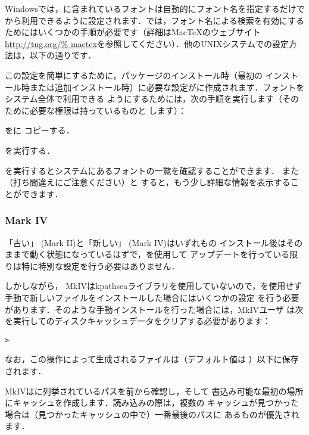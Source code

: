 \documentclass[uplatex,dvipdfmx]{jsarticle}
\begin{document}
Windowsでは，\TL に含まれているフォントは自動的にフォント名を指定するだけで\XeTeX
から利用できるように設定されます．\macOS では，フォント名による検索を有効にする
ためにはいくつかの手順が必要です（詳細はMac\TeX のウェブサイト\url{http://tug.org/%
mactex}を参照してください）．他のUNIXシステムでの設定方法は，以下の通りです．

この設定を簡単にするために，パッケージのインストール時（最初の\TL
インストール時または追加インストール時）に必要な設定がに作成されます．\TL フォントをシステム全体で利用できる
ようにするためには，次の手順を実行します（そのために必要な権限は持っているものと
します）：
%
\begin{enumerate*}
\item {}をに
  コピーする．
\item {}を実行する．
\end{enumerate*}

を実行するとシステムにあるフォントの一覧を確認することができます．
また（打ち間違えにご注意ください）と
すると，もう少し詳細な情報を表示することができます．

\subsubsection{{\ConTeXt} Mark IV}
\label{sec:context-mkiv}

「古い」{\ConTeXt} (Mark II)と「新しい」{\ConTeXt} (Mark IV)はいずれも\TL の
インストール後はそのままで動く状態になっているはずで，を使用して
アップデートを行っている限りは特に特別な設定を行う必要はありません．

しかしながら，{\ConTeXt} MkIVはkpathseaライブラリを使用していないので，を使用せず手動で新しいファイルをインストールした場合にはいくつかの設定
を行う必要があります．そのような手動インストールを行った場合には，MkIVユーザ
は次を実行して\ConTeXt のディスクキャッシュデータをクリアする必要があります：
%
\begin{alltt}
> 
\end{alltt}
%
なお，この操作によって生成されるファイルは（デフォルト値は
）以下に保存されます．

{\ConTeXt} MkIVはに列挙されているパスを前から確認し，そして
書込み可能な最初の場所にキャッシュを作成します．読み込みの際は，複数の
キャッシュが見つかった場合は（見つかったキャッシュの中で）一番最後のパスに
あるものが優先されます．
\end{document}
